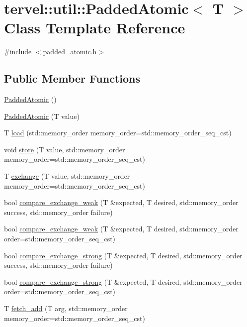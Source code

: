 \hypertarget{classtervel_1_1util_1_1_padded_atomic}{}\section{tervel\+:\+:util\+:\+:Padded\+Atomic$<$ T $>$ Class Template Reference}
\label{classtervel_1_1util_1_1_padded_atomic}


{\ttfamily \#include $<$padded\+\_\+atomic.\+h$>$}

\subsection*{Public Member Functions}
\begin{DoxyCompactItemize}
\item 
\hyperlink{classtervel_1_1util_1_1_padded_atomic_aa7929f3db1e0a13913692fe4db0b017a}{Padded\+Atomic} ()
\item 
\hyperlink{classtervel_1_1util_1_1_padded_atomic_a86f2c393839532e972a095d2b43be4d0}{Padded\+Atomic} (T value)
\item 
T \hyperlink{classtervel_1_1util_1_1_padded_atomic_a603ee3ac664c6121044c914f6824ee52}{load} (std\+::memory\+\_\+order memory\+\_\+order=std\+::memory\+\_\+order\+\_\+seq\+\_\+cst)
\item 
void \hyperlink{classtervel_1_1util_1_1_padded_atomic_a33f992fba64fdd3a7a17ab54d1abeca2}{store} (T value, std\+::memory\+\_\+order memory\+\_\+order=std\+::memory\+\_\+order\+\_\+seq\+\_\+cst)
\item 
T \hyperlink{classtervel_1_1util_1_1_padded_atomic_a7800d0cf0e9c78fa55375a1ce3030914}{exchange} (T value, std\+::memory\+\_\+order memory\+\_\+order=std\+::memory\+\_\+order\+\_\+seq\+\_\+cst)
\item 
bool \hyperlink{classtervel_1_1util_1_1_padded_atomic_a78f2403b679cb889cc3c460eb1b3a287}{compare\+\_\+exchange\+\_\+weak} (T \&expected, T desired, std\+::memory\+\_\+order success, std\+::memory\+\_\+order failure)
\item 
bool \hyperlink{classtervel_1_1util_1_1_padded_atomic_aff55fac4c51bd25c554da24a2b9037d3}{compare\+\_\+exchange\+\_\+weak} (T \&expected, T desired, std\+::memory\+\_\+order order=std\+::memory\+\_\+order\+\_\+seq\+\_\+cst)
\item 
bool \hyperlink{classtervel_1_1util_1_1_padded_atomic_a439f7948c88df740c4f39ec97570e28e}{compare\+\_\+exchange\+\_\+strong} (T \&expected, T desired, std\+::memory\+\_\+order success, std\+::memory\+\_\+order failure)
\item 
bool \hyperlink{classtervel_1_1util_1_1_padded_atomic_ac6c9885eb963cf7b1854ea00d7a8c89a}{compare\+\_\+exchange\+\_\+strong} (T \&expected, T desired, std\+::memory\+\_\+order order=std\+::memory\+\_\+order\+\_\+seq\+\_\+cst)
\item 
T \hyperlink{classtervel_1_1util_1_1_padded_atomic_ab5f6c8224a77c14dc9d5638cc916ea1e}{fetch\+\_\+add} (T arg, std\+::memory\+\_\+order memory\+\_\+order=std\+::memory\+\_\+order\+\_\+seq\+\_\+cst)
\end{DoxyCompactItemize}
